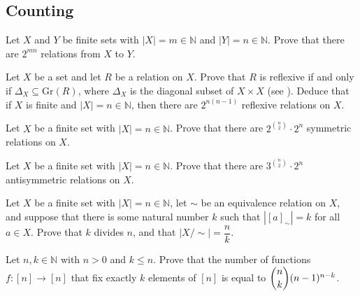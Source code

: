 
\subsection*{Counting}

\begin{chapex}
Let $X$ and $Y$ be finite sets with $|X|=m \in \mathbb{N}$ and $|Y|=n \in \mathbb{N}$. Prove that there are $2^{mn}$ relations from $X$ to $Y$.
\end{chapex}

\begin{chapex}
Let $X$ be a set and let $R$ be a relation on $X$. Prove that $R$ is reflexive if and only if $\Delta_X \subseteq \mathrm{Gr}(R)$, where $\Delta_X$ is the diagonal subset of $X \times X$ (see ). Deduce that if $X$ is finite and $|X|=n \in \mathbb{N}$, then there are $2^{n(n-1)}$ reflexive relations on $X$.
\end{chapex}

\begin{chapex}
Let $X$ be a finite set with $|X|=n \in \mathbb{N}$. Prove that there are $2^{\binom{n}{2}} \cdot 2^n$ symmetric relations on $X$.
\end{chapex}

\begin{chapex}
Let $X$ be a finite set with $|X|=n \in \mathbb{N}$. Prove that there are $3^{\binom{n}{2}} \cdot 2^n$ antisymmetric relations on $X$.
\end{chapex}

\begin{chapex}
\label{cqSizeOfQuotient}
Let $X$ be a finite set with $|X| = n \in \mathbb{N}$, let $\sim$ be an equivalence relation on $X$, and suppose that there is some natural number $k$ such that $|[a]_{\sim}| = k$ for all $a \in X$. Prove that $k$ divides $n$, and that $|X/{\sim}| = \dfrac{n}{k}$.
\end{chapex}

\begin{chapex}
Let $n,k \in \mathbb{N}$ with $n>0$ and $k \le n$. Prove that the number of functions $f : [n] \to [n]$ that fix exactly $k$ elements of $[n]$ is equal to $\dbinom{n}{k}(n-1)^{n-k}$.
\end{chapex}

